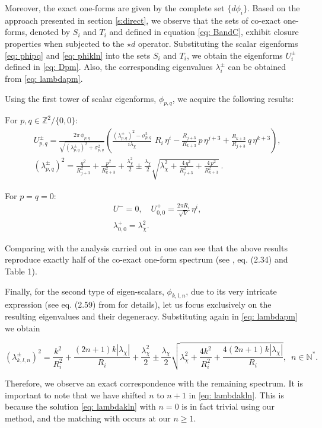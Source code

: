 \documentclass[11pt]{article}
\def\be{\begin{equation}}
\def\ee{\end{equation}}
\def\bea{\begin{eqnarray}}
\def\eea{\end{eqnarray}}
\begin{document}
Moreover, the exact one-forms are given by the complete set $\{d\phi_i\}$. Based on the approach presented in section \ref{s:direct}, we observe that the sets of co-exact one-forms, denoted by $S_i$ and $T_i$ and defined in equation \eqref{eq: BandC}, exhibit closure properties when subjected to the $\star d$ operator. \newline 
Substituting the scalar eigenforms \eqref{eq: phipq} and \eqref{eq: phikln} into the sets $S_i$ and $T_i$, we obtain the eigenforms $U_{i}^{\pm}$ defined in \eqref{eq: Dpm}. Also, the corresponding eigenvalues $\lambda^{\pm}_i$ can be obtained from \eqref{eq: lambdapm}.

Using the first tower of scalar eigenforms, $\phi_{p,q}$, we acquire the following results:
\vspace{1em}

$\text{For}\,\, p,q \in \mathbb{Z}^2/\{0,0\}:$
\bea
 &U^{\pm}_{p,q} = \frac{2\pi\,\phi_{p,q}}{\sqrt{(\lambda^{\pm}_{p,q})^2 +\sigma_{p,q}^2 }} \left(   \frac{(\lambda^{\pm}_{p,q})^2-\sigma_{p,q}^2 }{i \lambda_{\chi}}\,\,R_{i} \,\eta^{i}- \frac{R_{j+3} }{R_{k+3}}\,p\,\eta^{j+3}+\frac{R_{k+3}}{R_{j+3}}\,q\,\eta^{k+3}\right),\nonumber\\
&(\lambda^\pm_{p,q})^2 = \frac{q^2}{R^2_{j+3}}+\frac{p^2}{R^2_{k+3}}  + \frac{ \lambda_\chi^2}{2} \pm \frac{ \lambda_\chi}{2}\sqrt{ \lambda_\chi^2 +\frac{4\,q^2}{R^2_{j+3}}+\frac{4\,p^2}{R^2_{k+3}}   } \,. 
\eea

For $p=q=0$:
\bea
& U^{-}=0, \hspace{1em} U^{+}_{0,0} = \frac{2\pi R_{i}}{\sqrt{V}}\,\eta^{i},\\
&\lambda^{+}_{0,0} = \lambda_{\chi}^2.
\eea

Comparing with the analysis carried out in \cite{Andriot:2018tmb} one can see that the above results reproduce exactly half of the co-exact one-form spectrum (see \cite{Andriot:2018tmb}, eq. (2.34) and Table 1).

Finally, for the second type of eigen-scalars, $\phi_{k,l,n}$, due to its very intricate expression (see eq. (2.59) from \cite{Andriot:2018tmb} for details), let us focus exclusively on the resulting eigenvalues and their degeneracy. Substituting again in \eqref{eq: lambdapm} we obtain 

\be
 (\lambda_{k,l,n}^{\pm})^2 = \frac{k^2}{R_{i}^2} + \frac{(2n +1)k |\lambda_{\chi}|}{R_{i}} + \frac{\lambda_\chi^2}{2} \pm \frac{\lambda_\chi}{2}\sqrt{\lambda_\chi^2 + \frac{4k^2}{R_{i}^2} + \frac{4(2n +1)k |\lambda_{\chi}|}{R_{i}}},\,\,\, n\in\mathbb{N}^*. \label{eq: lambdakln}
\ee

Therefore, we observe an exact correspondence with the remaining spectrum. It is important to note that we have shifted $n$ to $n+1$ in \eqref{eq: lambdakln}. This is because the solution \eqref{eq: lambdakln} with $n=0$ is in fact trivial using our method, and the matching with \cite{Andriot:2018tmb} occurs at our $n\geq1$. 






\end{document}
